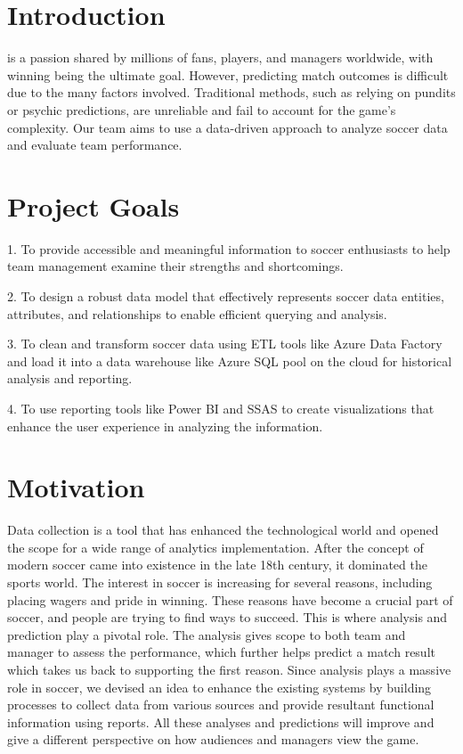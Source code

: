 \documentclass[lettersize]{IEEEtran}
\begin{document}
\section{\textbf{Introduction}}
 is a passion shared by millions of fans, players, and managers worldwide, with winning being the ultimate goal. However, predicting match outcomes is difficult due to the many factors involved. Traditional methods, such as relying on pundits or psychic predictions, are unreliable and fail to account for the game's complexity. Our team aims to use a data-driven approach to analyze soccer data and evaluate team performance.

\section{\textbf{Project Goals}}
1. To provide accessible and meaningful information to soccer enthusiasts to help team management examine their strengths and shortcomings.

2. To design a robust data model that effectively represents soccer data entities, attributes, and relationships to enable efficient querying and analysis.

3. To clean and transform soccer data using ETL tools like Azure Data Factory and load it into a data warehouse like Azure SQL pool on the cloud for historical analysis and reporting.

4. To use reporting tools like Power BI and SSAS to create visualizations that enhance the user experience in analyzing the information.

\section{\textbf{Motivation}}
Data collection is a tool that has enhanced the technological world and opened the scope for a wide range of analytics implementation. After the concept of modern soccer came into existence in the late 18th century, it dominated the sports world. The interest in soccer is increasing for several reasons, including placing wagers and pride in winning. These reasons have become a crucial part of soccer, and people are trying to find ways to succeed. This is where analysis and prediction play a pivotal role. The analysis gives scope to both team and manager to assess the performance, which further helps predict a match result which takes us back to supporting the first reason. Since analysis plays a massive role in soccer, we devised an idea to enhance the existing systems by building processes to collect data from various sources and provide resultant functional information using reports. All these analyses and predictions will improve and give a different perspective on how audiences and managers view the game. 
\end{document}
